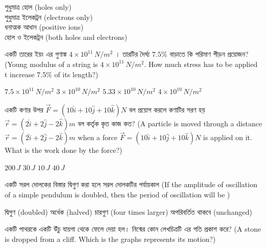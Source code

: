 \documentclass[addpoints]{exam}
\begin{document}
\begin{questions}
\begin{oneparchoices}
\choice  শুধুমাত্র হোল (holes only)\\
\hspace*{-.3cm}\choice   শুধুমাত্র ইলেকট্রন (electrons only)\\
\hspace*{-.3cm}\choice  ধনাত্মক আধান (positive ions)\\
\hspace*{-.3cm}\choice  হোল ও ইলেকট্রন (both holes and electrons)
\end{oneparchoices}

\question  একটি তারের ইয়ং এর গুণাঙ্ক $ 4\times 10^{11}\,N/m^{2} $ । তারটির দৈর্ঘ্য $ 7.5\% $  বাড়াতে কি পরিমাণ পীড়ন প্রয়োজন? (Young modulus of a string is $ 4\times 10^{11}\,N/m^{2} $. How much stress has to be applied t increase $ 7.5\% $ of its length?)

\begin{oneparchoices}
\choice $ 7.5\times 10^{11}\,N/m^{2} $
\choice $ 3\times 10^{10}\,N/m^{2} $
\choice $ 5.33\times 10^{10}\,N/m^{2} $
\choice $ 4\times 10^{10}\,N/m^{2} $

\end{oneparchoices}

\question একটি কণার উপর $ \vec{F}=(10\hat{i}+10\hat{j}+10\hat{k})N $ বল প্রয়োগ করলে কণাটির সরণ হয় $ \vec{r}= (2\hat{i}+2\hat{j}-2\hat{k})m$ বল কর্তৃক কৃত কাজ কত? (A particle is moved through a distance $ \vec{r}= (2\hat{i}+2\hat{j}-2\hat{k})m$ when a force $ \vec{F}=(10\hat{i}+10\hat{j}+10\hat{k})N $ is applied on it. What is the work done by the force?)

\begin{oneparchoices}
\choice $ 200\,J $
\choice $ 30\,J $
\choice $ 10\,J $
\choice $ 40\,J $
\end{oneparchoices}

\question  একটি সরল দোলকের বিস্তার দ্বিগুণ করা হলে সরল দোলকটির পর্যায়কাল (If the amplitude of oscillation of  a simple pendulum is doubled, then the period of oscillation will be )

\begin{oneparchoices}
\choice দ্বিগুণ (doubled)
\hspace*{-.4cm}\choice অর্ধেক (halved)
\hspace*{-.4cm}\choice চারগুণ (four times larger)
\hspace*{-.4cm}\choice অপরিবর্তিত থাকবে (unchanged)
\end{oneparchoices}


\question  একটি পাথরকে একটি উঁচু যায়গা থেকে ফেলে দেয়া হল। নিন্মের কোন লেখচিত্রটি এর গতি প্রকাশ করে? (A stone is dropped from a cliff. Which is the graphs represents its motion?)


\end{questions}
\end{document}
